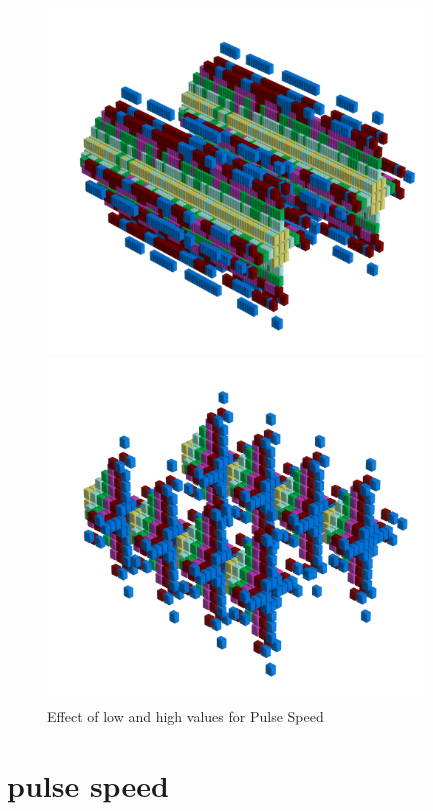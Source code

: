 \begin{figure}[H]
    \centering
    \begin{adjustbox}{width=10.5cm,center}
      \includegraphics[width=10cm]{src/pulsespeed/pattern0-45.png}%
    \end{adjustbox}
    \begin{adjustbox}{width=10.5cm,margin=0cm -2cm}
      \includegraphics[width=10cm]{src/pulsespeed/pattern1-45.png}%
    \end{adjustbox}
    \caption{Effect of low and high values for Pulse Speed}
\end{figure}
\clearpage
\section*{pulse speed} 
\label{sec:pulse_speed}
\lstset{style=6502Style}
\lstset{ 
   aboveskip=5pt,
   belowskip=0pt,
}

